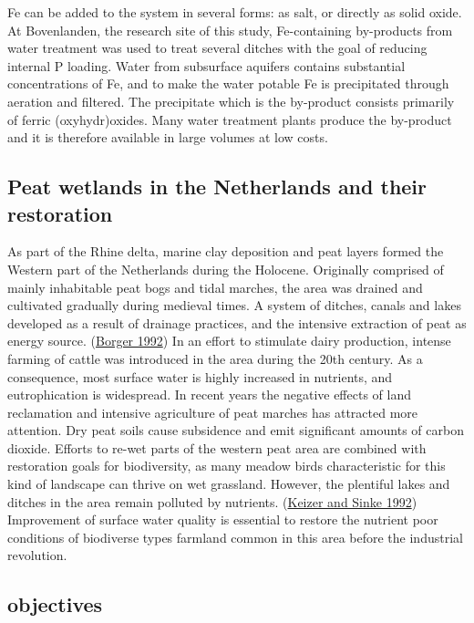 \documentclass[a4paper,11pt]{article}
\begin{document}
Fe can be added to the system in several forms: as salt, or directly as solid oxide. At Bovenlanden, the research site of this study, Fe-containing by-products from water treatment was used to treat several ditches with the goal of reducing internal P loading. Water from subsurface aquifers contains substantial concentrations of Fe, and to make the water potable Fe is precipitated through aeration and filtered. The precipitate which is the by-product consists primarily of ferric (oxyhydr)oxides. Many water treatment plants produce the by-product and it is therefore available in large volumes at low costs.

\hypertarget{peat-wetlands-in-the-netherlands-and-their-restoration}{%
\subsection{Peat wetlands in the Netherlands and their restoration}\label{peat-wetlands-in-the-netherlands-and-their-restoration}}

As part of the Rhine delta, marine clay deposition and peat layers formed the Western part of the Netherlands during the Holocene. Originally comprised of mainly inhabitable peat bogs and tidal marches, the area was drained and cultivated gradually during medieval times. A system of ditches, canals and lakes developed as a result of drainage practices, and the intensive extraction of peat as energy source. (\protect\hyperlink{ref-borgerDrainingDiggingDredging1992}{Borger 1992}) In an effort to stimulate dairy production, intense farming of cattle was introduced in the area during the 20th century. As a consequence, most surface water is highly increased in nutrients, and eutrophication is widespread. In recent years the negative effects of land reclamation and intensive agriculture of peat marches has attracted more attention. Dry peat soils cause subsidence and emit significant amounts of carbon dioxide. Efforts to re-wet parts of the western peat area are combined with restoration goals for biodiversity, as many meadow birds characteristic for this kind of landscape can thrive on wet grassland. However, the plentiful lakes and ditches in the area remain polluted by nutrients. (\protect\hyperlink{ref-keizerPhosphorusSedimentLoosdrecht1992}{Keizer and Sinke 1992}) Improvement of surface water quality is essential to restore the nutrient poor conditions of biodiverse types farmland common in this area before the industrial revolution.

\hypertarget{objectives}{%
\subsection{objectives}\label{objectives}}
\end{document}
